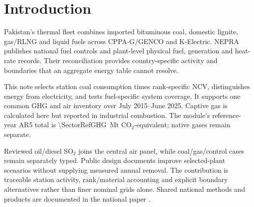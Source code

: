 \section{Introduction}
\label{sec:introduction}
Pakistan's thermal fleet combines imported bituminous coal, domestic lignite, gas/RLNG and liquid fuels across CPPA-G/GENCO and K-Electric. NEPRA publishes national fuel controls and plant-level physical fuel, generation and heat-rate records. Their reconciliation provides country-specific activity and boundaries that an aggregate energy table cannot resolve.

This note selects station coal consumption times rank-specific NCV, distinguishes energy from electricity, and tests fuel-specific system coverage. It supports one common GHG and air inventory over July 2015--June 2025. Captive gas is calculated here but reported in industrial combustion. The module's reference-year AR5 total is \SI{\SectorRefGHG}{\mega\tonne} CO$_2$-equivalent; native gases remain separate.

Reviewed oil/diesel SO$_2$ joins the central air panel, while coal/gas/control cases remain separately typed. Public design documents improve selected-plant scenarios without supplying measured annual removal. The contribution is traceable station activity, rank/material accounting and explicit boundary alternatives rather than finer nominal grids alone. Shared national methods and products are documented in the national paper \citep{ahmad2026national}.
